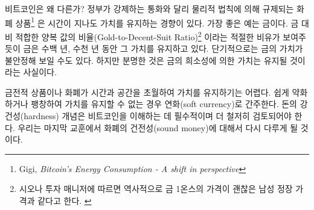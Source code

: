 \begin{comment}
	Why is Bitcoin different? In contrast to currencies mandated by the government,
	monetary goods which are not regulated by governments, but by the laws of
	physics\footnote{Gigi, \textit{Bitcoin's Energy Consumption - A shift in
			perspective} \cite{gigi:energy}}, tend to survive and even hold their respective
	value over time. The best example of this so far is gold, which, as the
	aptly-named \textit{Gold-to-Decent-Suit Ratio}\footnote{History shows that the
		price of an ounce of gold equals the price of a decent men's suit, according to Sionna
		investment managers \cite{web:gold-to-decent-suite-ratio}} shows, is holding its
	value over hundreds and even thousands of years. It might not be perfectly
	\enquote{stable} --- a questionable concept in the first place --- but the value it
	holds will at least be in the same order of magnitude.
\end{comment}
비트코인은 왜 다른가? 정부가 강제하는 통화와 달리 물리적 법칙에 의해 규제되는 화폐 상품\footnote{Gigi, \textit{Bitcoin's Energy Consumption - A shift in perspective}\cite{gigi:energy}}
은 시간이 지나도 가치를 유지하는 경향이 있다. 가장 좋은 예는 금이다. 
금 대비 적합한 양복 값의 비율(Gold-to-Decent-Suit Ratio)\footnote{시오나 투자 매니저에 따르면 역사적으로 금 1온스의 가격이 괜찮은 남성 정장 가격과 같다고 한다. \cite{web:gold-to-decent-suite-ratio}}
이라는 적절한 비유가 보여주듯이 금은 수백 년, 수천 년 동안 그 가치를 유지하고 있다. 
단기적으로는 금의 가치가 불안정해 보일 수도 있다.
하지만 분명한 것은 금의 희소성에 의한 가치는 유지될 것이라는 사실이다.

\begin{comment}
	If a monetary good or currency holds its value well over time and space,
	it is considered to be \textit{hard}. If it can't hold its value, because it
	easily deteriorates or inflates, it is considered a \textit{soft} currency. The
	concept of hardness is essential to understand Bitcoin and is worthy of
	a more thorough examination. We will return to it in the last economic
	lesson: sound money.
\end{comment}
금전적 상품이나 화폐가 시간과 공간을 초월하여 가치를 유지하기는 어렵다. 
쉽게 약화하거나 팽창하여 가치를 유지할 수 없는 경우 연화(soft currency)로 간주한다. 
돈의 강건성(hardness) 개념은 비트코인을 이해하는 데 필수적이며 더 철저히 검토되어야 한다.
우리는 마지막 교훈에서 화폐의 건전성(sound money)에 대해서 다시 다루게 될 것이다.

